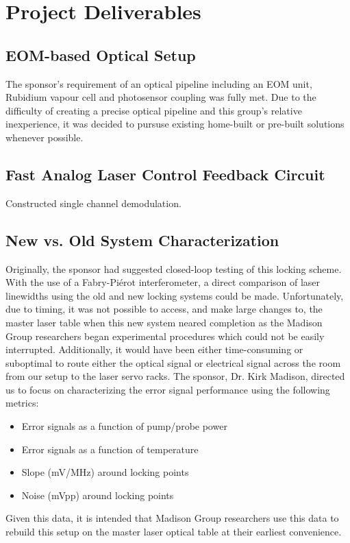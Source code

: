 \newpage
\section{Project Deliverables}

\subsection{EOM-based Optical Setup}

The sponsor's requirement of an optical pipeline including an EOM unit, Rubidium vapour cell and photosensor coupling was fully met. Due to the difficulty of creating a precise optical pipeline and this group's relative inexperience, it was decided to pursuse existing home-built or pre-built solutions whenever possible.

\subsection{Fast Analog Laser Control Feedback Circuit}

Constructed single channel demodulation.

\subsection{New vs. Old System Characterization}

Originally, the sponsor had suggested closed-loop testing of this locking scheme. With the use of a Fabry-Pi{\'e}rot interferometer, a direct comparison of laser linewidths using the old and new locking systems could be made. Unfortunately, due to timing, it was not possible to access, and make large changes to, the master laser table when this new system neared completion as the Madison Group researchers began experimental procedures which could not be easily interrupted. Additionally, it would have been either time-consuming or suboptimal to route either the optical signal or electrical signal across the room from our setup to the laser servo racks. The sponsor, Dr. Kirk Madison, directed us to focus on characterizing the error signal performance using the following metrics:
\begin{itemize}
    \item Error signals as a function of pump/probe power
    \item Error signals as a function of temperature
    \item Slope (mV/MHz) around locking points
    \item Noise (mVpp) around locking points
\end{itemize}
Given this data, it is intended that Madison Group researchers use this data to rebuild this setup on the master laser optical table at their earliest convenience.